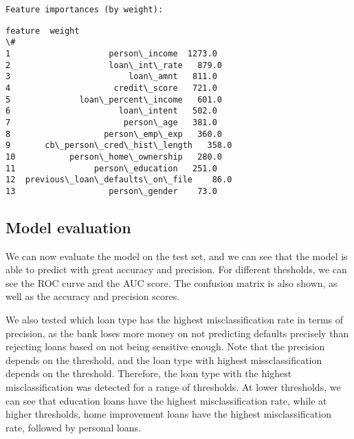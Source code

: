 \documentclass[11pt]{article}
\makeatletter
\newcommand{\boxspacing}{\kern\kvtcb@left@rule\kern\kvtcb@boxsep}
\newcommand{\prompt}[4]{
        {\ttfamily\llap{{\color{#2}[#3]:\hspace{3pt}#4}}\vspace{-\baselineskip}}
    }
\makeatother
\begin{document}
    \begin{Verbatim}[commandchars=\\\{\}]
Feature importances (by weight):
    \end{Verbatim}

            \begin{tcolorbox}[breakable, size=fbox, boxrule=.5pt, pad at break*=1mm, opacityfill=0]
\prompt{Out}{outcolor}{25}{\boxspacing}
\begin{Verbatim}[commandchars=\\\{\}]
                           feature  weight
\#
1                    person\_income  1273.0
2                    loan\_int\_rate   879.0
3                        loan\_amnt   811.0
4                     credit\_score   721.0
5              loan\_percent\_income   601.0
6                      loan\_intent   502.0
7                       person\_age   381.0
8                   person\_emp\_exp   360.0
9       cb\_person\_cred\_hist\_length   358.0
10           person\_home\_ownership   280.0
11                person\_education   251.0
12  previous\_loan\_defaults\_on\_file    86.0
13                   person\_gender    73.0
\end{Verbatim}
\end{tcolorbox}
        
    \subsection{Model evaluation}\label{model-evaluation}

We can now evaluate the model on the test set, and we can see that the
model is able to predict with great accuracy and precision. For
different thesholds, we can see the ROC curve and the AUC score. The
confusion matrix is also shown, as well as the accuracy and precision
scores.

We also tested which loan type has the highest misclassification rate in
terms of precision, as the bank loses more money on not predicting
defaults precisely than rejecting loans based on not being sensitive
enough. Note that the precision depends on the threshold, and the loan
type with highest missclassification depends on the threshold.
Therefore, the loan type with the highest misclassification was detected
for a range of thresholds. At lower thresholds, we can see that
education loans have the highest misclassification rate, while at higher
thresholds, home improvement loans have the highest misclassification
rate, followed by personal loans.
\end{document}
